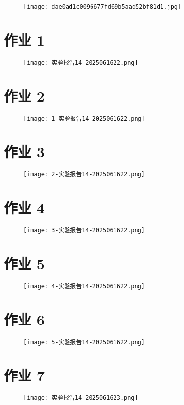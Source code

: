 \begin{figure}[H]
\centering
\texttt{[image: dae0ad1c0096677fd69b5aad52bf81d1.jpg]}
\label{}
\end{figure}

\section{作业 1}

\begin{figure}[H]
\centering
\texttt{[image: 实验报告14-2025061622.png]}
\label{}
\end{figure}

\section{作业 2}

\begin{figure}[H]
\centering
\texttt{[image: 1-实验报告14-2025061622.png]}
\label{}
\end{figure}

\section{作业 3}

\begin{figure}[H]
\centering
\texttt{[image: 2-实验报告14-2025061622.png]}
\label{}
\end{figure}

\section{作业 4}

\begin{figure}[H]
\centering
\texttt{[image: 3-实验报告14-2025061622.png]}
\label{}
\end{figure}

\section{作业 5}

\begin{figure}[H]
\centering
\texttt{[image: 4-实验报告14-2025061622.png]}
\label{}
\end{figure}

\section{作业 6}

\begin{figure}[H]
\centering
\texttt{[image: 5-实验报告14-2025061622.png]}
\label{}
\end{figure}

\section{作业 7}

\begin{figure}[H]
\centering
\texttt{[image: 实验报告14-2025061623.png]}
\label{}
\end{figure}
